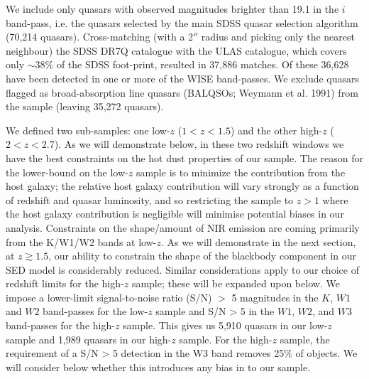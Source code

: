 We include only quasars with observed magnitudes brighter than 19.1 in the $i$ band-pass, i.e. the quasars selected by the main SDSS quasar selection algorithm (70,214 quasars). 
Cross-matching (with a 2$''$ radius and picking only the nearest neighbour) the SDSS DR7Q catalogue with the ULAS catalogue, which covers only $\sim 38$\% of the SDSS foot-print, resulted in 37,886 matches. 
Of these 36,628 have been detected in one or more of the WISE band-passes. 
We exclude quasars flagged as broad-absorption line quasars (BALQSOs; Weymann et al. 1991) from the sample (leaving 35,272 quasars).

We defined two sub-samples: one low-$z$ ($1 < z < 1.5$) and the other high-$z$ ($2 < z < 2.7$). 
As we will demonstrate below, in these two redshift windows we have the best constraints on the hot dust properties of our sample. 
The reason for the lower-bound on the low-$z$ sample is to minimize the contribution from the host galaxy; the relative host galaxy contribution will vary strongly as a function of redshift and quasar luminosity, and so restricting the sample to $z>1$ where the host galaxy contribution is negligible will minimise potential biases in our analysis. 
Constraints on the shape/amount of NIR emission are coming primarily from the K/W1/W2 bands at low-$z$. 
As we will demonstrate in the next section, at $z \gtrsim 1.5$, our ability to constrain the shape of the blackbody component in our SED model is considerably reduced. 
Similar considerations apply to our choice of redshift limits for the high-$z$ sample; these will be expanded upon below. 
We impose a lower-limit signal-to-noise ratio (S/N) $>$ 5 magnitudes in the $K$, $W1$ and $W2$ band-passes for the low-$z$ sample and S/N > 5 in the $W1$, $W2$, and $W3$ band-passes for the high-$z$ sample. 
This gives us 5,910 quasars in our low-$z$ sample and 1,989 quasars in our high-$z$ sample. 
For the high-$z$ sample, the requirement of a S/N > 5 detection in the W3 band removes 25\% of objects. 
We will consider below whether this introduces any bias in to our sample. 

